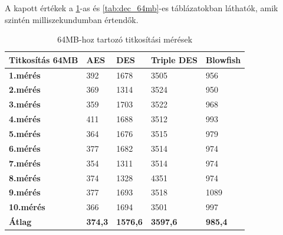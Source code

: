 A kapott értékek a \ref{tab:enc_64mb}-as és \ref{tab:dec_64mb}-es táblázatokban láthatók, amik szintén milliszekundumban értendők.
\begin{table}[H]
	\centering
	\caption{64MB-hoz tartozó titkosítási mérések}
	\label{tab:enc_64mb}
	\medskip
	\begin{tabular}{|p{2.4cm}|p{2cm}|p{2cm}|p{2cm}|p{2cm}|}
		\hline
		\textbf{Titkosítás} \newline \textbf{64MB} & \textbf{AES} & \textbf{DES} & \textbf{Triple DES} & \textbf{Blowfish}\\
		\hline
		\textbf{1.mérés} & 392 & 1678 & 3505 & 956\\
		\hline
		\textbf{2.mérés} & 369 & 1314 & 3524 & 950\\
		\hline
		\textbf{3.mérés} & 359 & 1703 & 3522 & 968\\
		\hline
		\textbf{4.mérés} & 411 & 1688 & 3512 & 993\\
		\hline
		\textbf{5.mérés} & 364 & 1676 & 3515 & 979\\
		\hline
		\textbf{6.mérés} & 377 & 1682 & 3514 & 974\\
		\hline
		\textbf{7.mérés} & 354 & 1311 & 3514 & 974\\
		\hline
		\textbf{8.mérés} & 374 & 1328 & 4351 & 974\\
		\hline
		\textbf{9.mérés} & 377 & 1693 & 3518 & 1089\\
		\hline
		\textbf{10.mérés} & 366 & 1694 & 3501 & 997\\
		\hline
		\hline
		\textbf{Átlag} & \textbf{374,3} & \textbf{1576,6} & \textbf{3597,6} & \textbf{985,4}\\
		\hline
	\end{tabular}
\end{table}

